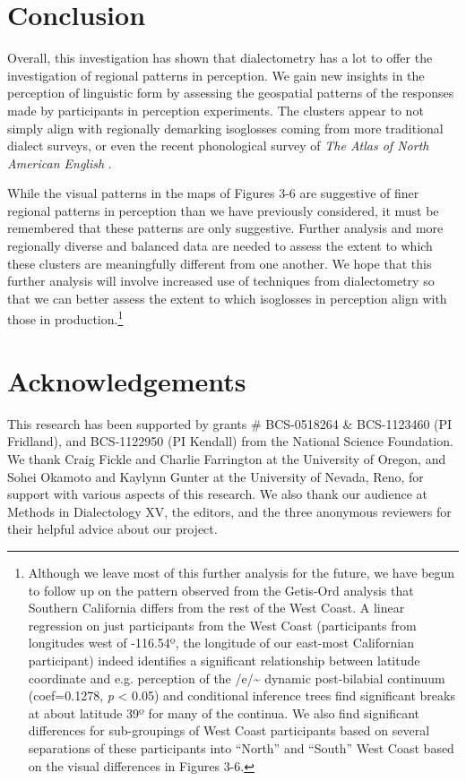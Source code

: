 \documentclass[output=paper]{LSP/langsci}
\begin{document}
\section{Conclusion}
Overall, this investigation has shown that dialectometry has a lot to offer the investigation of regional patterns in perception. We gain new insights in the perception of linguistic form by assessing the geospatial patterns of the responses made by participants in perception experiments. The clusters appear to not simply align with regionally demarking isoglosses coming from more traditional dialect surveys, or even the recent phonological survey of \textit{The Atlas of North American English} \citep{labov_atlas_2006-1}.

While the visual patterns in the maps of Figures 3-6 are suggestive of finer regional patterns in perception than we have previously considered, it must be remembered that these patterns are only suggestive. Further analysis and more regionally diverse and balanced data are needed to assess the extent to which these clusters are meaningfully different from one another. We hope that this further analysis will involve increased use of techniques from dialectometry so that we can better assess the extent to which isoglosses in perception align with those in production.\footnote{Although we leave most of this further analysis for the future, we have begun to follow up on the pattern observed from the Getis-Ord analysis that Southern California differs from the rest of the West Coast. A linear regression on just participants from the West Coast (participants from longitudes west of -116.54º, the longitude of our east-most Californian participant) indeed identifies a significant relationship between latitude coordinate and e.g. perception of the /e/\~{}
dynamic post-bilabial continuum (coef=0.1278, \textit{p} {\textless} 0.05) and conditional inference trees find significant breaks at about latitude 39º for many of the continua. We also find significant differences for sub-groupings of West Coast participants based on several separations of these participants into “North” and “South” West Coast based on the visual differences in Figures 3-6.}

\section*{Acknowledgements}
This research has been supported by grants \# BCS-0518264 \& BCS-1123460 (PI Fridland), and BCS-1122950 (PI Kendall) from the National Science Foundation. We thank Craig Fickle and Charlie Farrington at the University of Oregon, and Sohei Okamoto and Kaylynn Gunter at the University of Nevada, Reno, for support with various aspects of this research. We also thank our audience at Methods in Dialectology XV, the editors, and the three anonymous reviewers for their helpful advice about our project.

\printbibliography[heading=subbibliography,notkeyword=this]
\end{document}
